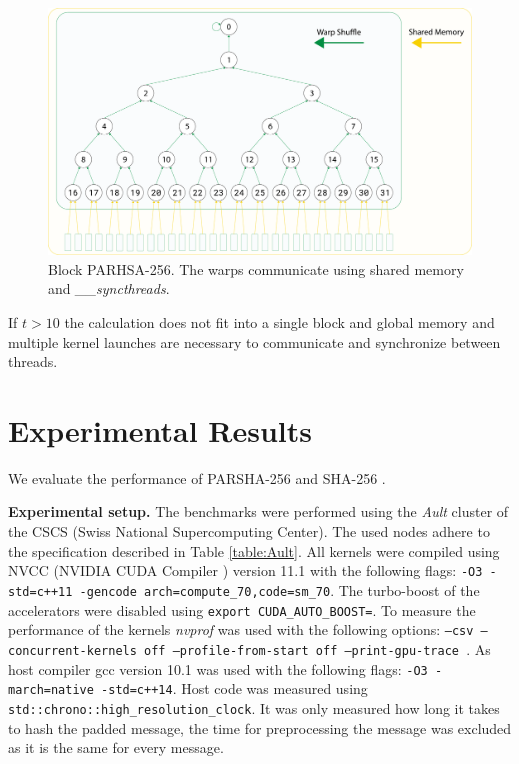 \documentclass[letterpaper]{article}
\newcommand{\mypar}[1]{{\bf #1.}}
\begin{document}
\begin{figure}[t]\centering
\includegraphics[scale=0.125]{block2.pdf}
  \caption{Block PARHSA-256. The warps communicate using shared memory and \emph{\_\_syncthreads}. \label{fig:block}}
\end{figure}

If $t > 10$ the calculation does not fit into a single block and global memory and multiple kernel launches are necessary to communicate and synchronize between threads.









\section{Experimental Results}\label{sec:exp}
We evaluate the performance of PARSHA-256 and SHA-256 . 

\mypar{Experimental setup} The benchmarks were performed using the \emph{Ault} cluster of the CSCS (Swiss National Supercomputing Center). The used nodes adhere to the specification described in Table \ref{table:Ault}.
All kernels were compiled using NVCC (NVIDIA CUDA Compiler \cite{nvcc}) version 11.1 with the following flags: \texttt{-O3 -std=c++11 -gen\-code arch=compute\_70,code=sm\_70}.
The  turbo-boost  of  the  accelerators  were  disabled  using \texttt{export \- CUDA\-\_\-AUTO\-\_\-BOOST\-=}.
To measure the performance of the kernels \emph{nvprof} \cite{nvprof} was used with the following options: \texttt{--csv --con\-current-\-kernels off  --profile\--from\--start off --print\--gpu\--trace }. As host compiler gcc \cite{gcc} version 10.1 was used with the following flags: \texttt{-O3 -march=native -std=c++14}. Host code was measured using \texttt{std\-::\-chrono\-::\-high\-\_\-re\-so\-lu\-ti\-on\-\-\_\-clock}. 
It was only measured how long it takes to hash the padded message, the time for preprocessing the message was excluded as it is the same for every message.
\end{document}

